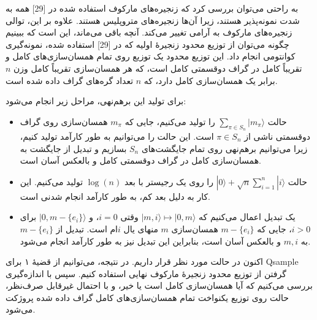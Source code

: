 به راحتی می‌توان بررسی کرد که زنجیره‌های مارکوف استفاده شده در [29] همه به شدت نمونه‌پذیر هستند، زیرا آن‌ها زنجیره‌های متروپلیس هستند. علاوه بر این، توالی زنجیره‌های مارکوف به آرامی تغییر می‌کند. آنچه باقی می‌ماند، این است که ببینیم چگونه می‌توان از توزیع محدود زنجیرهٔ اولیه که در [29] استفاده شده، نمونه‌گیری کوانتومی انجام داد. این توزیع محدود یک توزیع روی تمام همسان‌سازی‌های کامل و تقریباً کامل در گراف دو‌قسمتی کامل است، که هر همسان‌سازی تقریباً کامل وزن $n$ برابر یک همسان‌سازی کامل دارد، که $n$ تعداد گره‌های گراف داده شده است.  

برای تولید این برهم‌نهی، مراحل زیر انجام می‌شود:  
\begin{itemize}
	\item حالت $\sum_{\pi \in S_n} |m_\pi\rangle$ را تولید می‌کنیم، جایی که $m_\pi$ همسان‌سازی روی گراف دو‌قسمتی ناشی از $\pi \in S_n$ است. این حالت را می‌توانیم به طور کارآمد تولید کنیم، زیرا می‌توانیم برهم‌نهی روی تمام جایگشت‌های $S_n$ بسازیم و تبدیل از جایگشت به همسان‌سازی کامل در گراف دو‌قسمتی کامل و بالعکس آسان است.
	\item حالت $|0\rangle + \sqrt{n} \sum_{i=1}^{n} |i\rangle$ را روی یک رجیستر با بعد $\log(n)$ تولید می‌کنیم. این کار به دلیل بعد کم، به طور کارآمد انجام شدنی است.
	\item یک تبدیل اعمال می‌کنیم که $|m, i\rangle \mapsto |0, m\rangle$ وقتی $i=0$، و $|0, m - \{e_i\}\rangle$ برای $i>0$، جایی که $m - \{e_i\}$ همسان‌سازی $m$ منهای یال $i$ام است. تبدیل از $m - \{e_i\}$ به $m, i$ و بالعکس آسان است، بنابراین این تبدیل نیز به طور کارآمد انجام می‌شود.
\end{itemize}

اکنون در حالت مورد نظر قرار داریم. در نتیجه، می‌توانیم از قضیهٔ ۱ برای Qsample گرفتن از توزیع محدود زنجیرهٔ مارکوف نهایی استفاده کنیم. سپس با اندازه‌گیری بررسی می‌کنیم که آیا همسان‌سازی کامل است یا خیر، و با احتمال غیرقابل صرف‌نظر، حالت روی توزیع یکنواخت تمام همسان‌سازی‌های کامل گراف داده شده پروژکت می‌شود.

